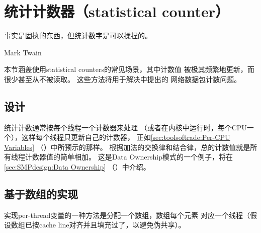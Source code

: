 \section{统计计数器（statistical counter）}
\label{sec:count:Statistical Counters}
%
\epigraph{事实是固执的东西，但统计数字是可以揉捏的。}
	 {Mark Twain}

本节涵盖使用statistical counters的常见场景，其中计数值
被极其频繁地更新，而很少甚至从不被读取。
这些方法将用于解决\QuickQuizRef{\QcountQstatcnt}中提出的
网络数据包计数问题。

\subsection{设计}

统计计数通常按每个线程一个计数器来处理
（或者在内核中运行时，每个CPU一个），这样每个线程只更新自己的计数器，
正如\cref{sec:toolsoftrade:Per-CPU Variables}
（）中所预示的那样。
根据加法的交换律和结合律，总的计数值就是所有线程计数器值的简单相加。
这是Data Ownership模式的一个例子，将在
\cref{sec:SMPdesign:Data Ownership}
（）中介绍。

\QuickQuizEnd

\subsection{基于数组的实现}
\label{sec:count:Array-Based Implementation}

实现per-thread变量的一种方法是分配一个数组，数组每个元素
对应一个线程（假设数组已按cache line对齐并且填充过了，以避免伪共享）。

\QuickQuizEnd


